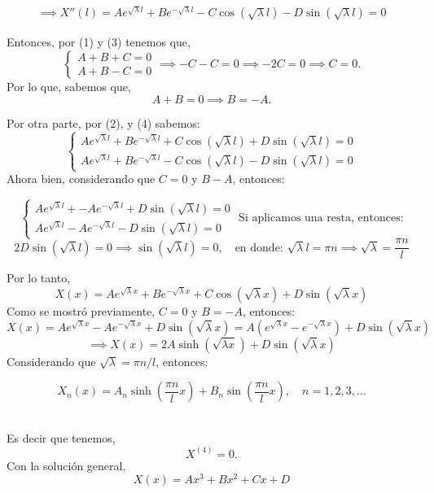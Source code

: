 \begin{solution}
\begin{gather}
    \implies X''(l)=Ae^{\sqrt{\lambda}l} +Be^{-\sqrt{\lambda}l}- C\cos(\sqrt{\lambda}l)- D\sin(\sqrt{\lambda}l)=0
\end{gather}

\lineata 

Entonces, por (1) y (3) tenemos que, 
$$\begin{cases}A+B+C=0\\ A+B-C=0\end{cases}\implies -C-C=0\implies -2C=0\implies C=0.$$
Por lo que, sabemos que, 
$$A+B=0 \implies B=-A.$$

Por otra parte, por (2), y (4) sabemos:
$$\begin{cases}Ae^{\sqrt{\lambda}l}+Be^{-\sqrt{\lambda}l}+C\cos(\sqrt{\lambda}l)+D\sin(\sqrt{\lambda}l)=0\\ 
Ae^{\sqrt{\lambda}l} +Be^{-\sqrt{\lambda}l}- C\cos(\sqrt{\lambda}l)- D\sin(\sqrt{\lambda}l)=0 \end{cases} $$
Ahora bien, considerando que $C=0$ y $B-A$, entonces: 

$$\begin{cases}Ae^{\sqrt{\lambda}l}+-Ae^{-\sqrt{\lambda}l}+D\sin(\sqrt{\lambda}l)=0\\ 
Ae^{\sqrt{\lambda}l} -Ae^{-\sqrt{\lambda}l}- D\sin(\sqrt{\lambda}l)=0 \end{cases}\text{ Si aplicamos una resta, entonces:} $$
$$2D\sin(\sqrt{\lambda}l)=0\implies \sin(\sqrt{\lambda}l)=0, \quad \text{en donde: $\sqrt{\lambda} l=\pi n\implies \sqrt{\lambda}=\frac{\pi n}{l}$}$$

\lineata 

Por lo tanto, 
$$X(x)=Ae^{\sqrt{\lambda}x}+Be^{-\sqrt{\lambda}x}+C\cos(\sqrt{\lambda}x)+D\sin(\sqrt{\lambda}x)$$
Como se mostró previamente, $C=0$ y $B=-A$, entonces:
$$X(x)=Ae^{\sqrt{\lambda}x}-Ae^{-\sqrt{\lambda}x}+D\sin(\sqrt{\lambda}x)= A\left(e^{\sqrt{\lambda}x}-e^{-\sqrt{\lambda}x}\right)+D\sin(\sqrt{\lambda}x)$$
$$\implies X(x)=2A\sinh(\sqrt{\lambda x})+D\sin(\sqrt{\lambda}x)$$
Considerando que $\sqrt{\lambda}= \pi n/l$, entonces: 

$$X_n(x)=A_n \sinh\left(\frac{\pi n}{l} x\right)+B_n\sin\left(\frac{\pi n}{l}x\right), \quad n=1,2,3,...$$

\linita 

\\
Es decir que tenemos, 
$$X^{(4)}=0.$$
Con la solución general, 
$$X(x)=Ax^3+Bx^2+Cx+D$$

\lineata


\end{solution}

